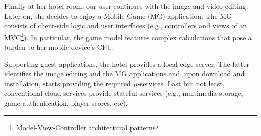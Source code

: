 



Finally at her hotel room, our user 
continues with the image and video editing. Later on, she decides to enjoy a Mobile Game (MG) application. The MG consists of client-side logic and
user interfaces (e.g., controllers and views of an MVC\footnote{Model-View-Controller architectural pattern}). In particular, the game model features complex calculations that pose a burden to her mobile device's CPU. 

Supporting guest applications, the hotel provides a local-edge server. The latter identifies the image editing and the MG applications and, upon download and installation, starts providing the required $\mu$-services. %
Last but not least, conventional cloud services provide stateful services (e.g., multimedia storage, game authentication, player scores, etc).%

